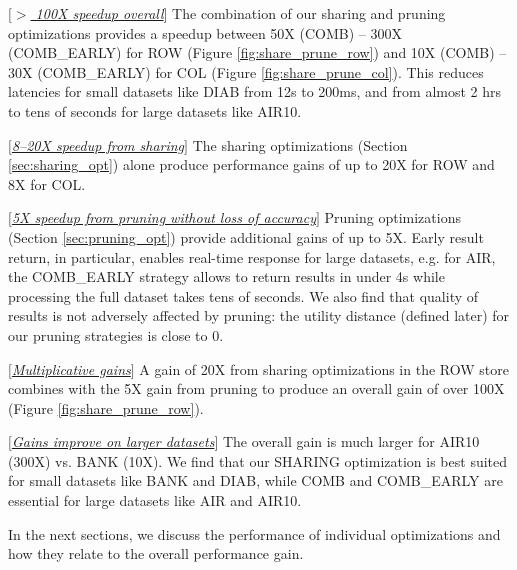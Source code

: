 \begin{denselist} 
\item $[$\underline{\em $>$ 100X speedup overall}$]$ The combination of our sharing and pruning optimizations provides a speedup between 50X (COMB) -- 300X (COMB\_EARLY) for ROW (Figure \ref{fig:share_prune_row}) and 
10X (COMB) -- 30X (COMB\_EARLY) for COL (Figure \ref{fig:share_prune_col}).
This reduces latencies for small datasets like DIAB from 12s to 200ms, and from almost 2 hrs to tens of seconds for large datasets 
like AIR10. 
\item $[$\underline{\em 8--20X speedup from sharing}$]$ The sharing optimizations (Section \ref{sec:sharing_opt}) alone produce performance gains of up to 20X for ROW and 8X for COL. 
\item $[$\underline{\em 5X speedup from pruning without loss of accuracy}$]$ Pruning optimizations (Section \ref{sec:pruning_opt}) provide additional gains of up to 5X. Early result return, in particular, enables real-time response for large datasets, e.g. for AIR, the COMB\_EARLY strategy allows \SeeDB to return results in under 4s while processing the full dataset takes tens of seconds. We also find that quality of results is not adversely affected by pruning: the utility distance (defined later) for our pruning strategies is close to 0.
\item $[$\underline{\em Multiplicative gains}$]$ A gain of 20X from sharing optimizations in the ROW store combines with the 5X gain from pruning to produce an overall gain of over 100X (Figure \ref{fig:share_prune_row}).
\item $[$\underline{\em Gains improve on larger datasets}$]$ The overall gain is much larger for AIR10 (300X) vs. BANK (10X). We find that our SHARING optimization is best suited for small datasets like BANK and DIAB, while COMB and COMB\_EARLY are essential for large datasets like AIR and AIR10.
\end{denselist}



\noindent In the next sections, we discuss the performance of individual optimizations and how they relate to the overall performance gain.



